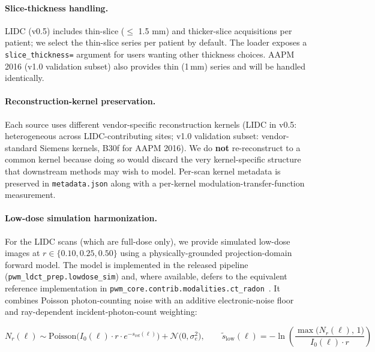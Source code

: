 \documentclass[twoside,11pt]{article}
\begin{document}
\paragraph{Slice-thickness handling.} LIDC (v0.5) includes thin-slice ($\leq$ 1.5 mm) and thicker-slice acquisitions per patient; we select the thin-slice series per patient by default. The loader exposes a \texttt{slice\_thickness=} argument for users wanting other thickness choices. AAPM 2016 (v1.0 validation subset) also provides thin (1\,mm) series and will be handled identically.

\paragraph{Reconstruction-kernel preservation.} Each source uses different vendor-specific reconstruction kernels (LIDC in v0.5: heterogeneous across LIDC-contributing sites; v1.0 validation subset: vendor-standard Siemens kernels, B30f for AAPM 2016). We do \textbf{not} re-reconstruct to a common kernel because doing so would discard the very kernel-specific structure that downstream methods may wish to model. Per-scan kernel metadata is preserved in \texttt{metadata.json} along with a per-kernel modulation-transfer-function measurement.

\paragraph{Low-dose simulation harmonization.} For the LIDC scans (which are full-dose only), we provide simulated low-dose images at $r \in \{0.10, 0.25, 0.50\}$ using a physically-grounded projection-domain forward model. The model is implemented in the released pipeline (\texttt{pwm\_ldct\_prep.lowdose\_sim}) and, where available, defers to the equivalent reference implementation in \texttt{pwm\_core.contrib.modalities.ct\_radon}~\citep{pwmcore}. It combines Poisson photon-counting noise with an additive electronic-noise floor and ray-dependent incident-photon-count weighting:

\begin{equation}
    N_r(\ell) \sim \textrm{Poisson}\!\big(I_0(\ell) \cdot r \cdot e^{-s_{\textrm{ref}}(\ell)}\big) + \mathcal{N}\!\big(0,\sigma_e^2\big), \qquad \tilde{s}_{\textrm{low}}(\ell) = -\ln\!\left( \frac{\max\!\big(N_r(\ell),\,1\big)}{I_0(\ell) \cdot r} \right)
    \label{eq:lowdose_sim}
\end{equation}
\end{document}
